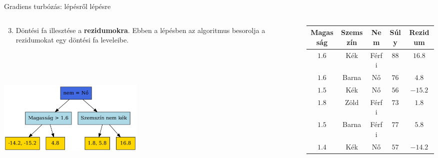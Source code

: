\documentclass[english, aspectratio=169]{beamer}
\begin{document}
\begin{frame}{Gradiens turbózás: lépésről lépésre}
\begin{columns}
\begin{column}{.5\textwidth}
\begin{enumerate}
	\setcounter{enumi}{2}
	\item Döntési fa illesztése a \textbf{rezidumokra}. Ebben a lépésben az algoritmus besorolja a rezidumokat egy döntési fa leveleibe. 
\end{enumerate}
\begin{center}
\includegraphics[width=7cm, height=7cm, keepaspectratio]{graphs/ensemble_5.png}
\end{center}
\end{column}
\begin{column}{.5\textwidth}
\begin{center}
\begin{small}
\begin{tabular}{|c|c|c|c|c|}
\hline
Magasság & Szemszín & Nem & Súly & Rezidum \\ \hline
$1.6$      & Kék      & Férfi & $88$  & $16.8$   \\ \hline
$1.6$      & Barna    & Nő    & $76$  & $4.8$    \\ \hline
$1.5$      & Kék      & Nő    & $56$  & $-15.2$  \\ \hline
$1.8$      & Zöld     & Férfi & $73$  & $1.8$    \\ \hline
$1.5$      & Barna    & Férfi & $77$  & $5.8$    \\ \hline
$1.4$      & Kék      & Nő    & $57$  & $-14.2$  \\ \hline
\end{tabular}
\end{small}
\end{center}
\end{column}
\end{columns}
\end{frame}
\end{document}

